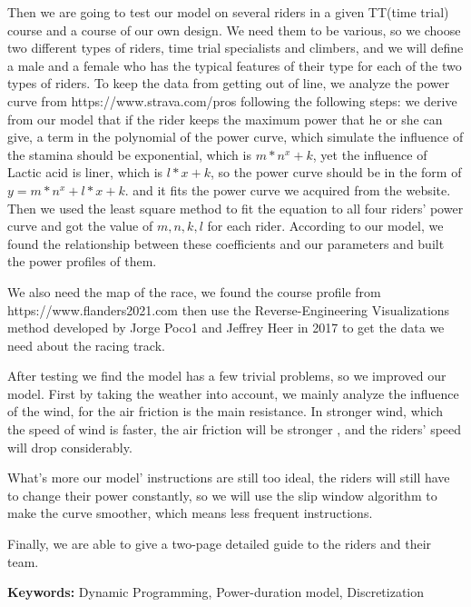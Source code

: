\documentclass[12pt]{article}
\begin{document}
Then we are going to test our model on several riders in a given TT(time trial) course and a course of our own design. We need them to be various, so we choose two different types of riders, time trial
specialists and climbers, and we will define a male and a female who has the typical features of their type for each of the two types of riders.
To keep the data from getting out of line, we analyze the power curve
from https://www.strava.com/pros following the following steps:
we derive from our model that if the rider keeps the maximum power that he or she can give, a term in the polynomial of the power curve,  which simulate the influence of the stamina should be exponential,
which is $m*n^x+k$, yet the influence of Lactic acid is liner, which is $l*x+k$, so the power curve should be in the form of $y=m*n^x+l*x+k$.
and it fits the power curve we acquired from the website.
Then we used the least square method to fit the equation to all four riders' power curve and  %
got the value of $m,n,k,l$ for each rider. According to our model, we found the relationship between these
coefficients and our parameters and built the power profiles of them.

We also need the map of the race, we found the course profile from https://www.flanders2021.com
then use the Reverse-Engineering Visualizations method developed by Jorge Poco1 and Jeffrey Heer in 2017\cite{poco2017reverse} to get the data we need about the racing track.

After testing we find the model has a few trivial problems, so we improved our model.
First by taking the weather into account, we mainly analyze the influence of the
wind, for the air friction is the main resistance. In stronger wind, which the speed of wind is faster, the air friction will be stronger ,
and the riders' speed will drop considerably.

What's more our model' instructions are still too ideal, the riders will still have to change their power constantly, so we will use the slip window algorithm to make the curve
smoother, which means less frequent instructions.

Finally, we are able to  give a two-page detailed guide to the riders and their team.

\begin{flushleft}
    \textbf{Keywords:} Dynamic Programming, Power-duration model, Discretization
\end{flushleft}


\end{document}
